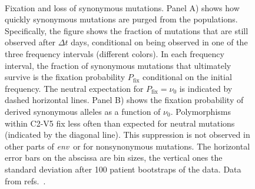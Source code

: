 \documentclass[rmp, twocolumn]{revtex4}
\newcommand{\pfix}{P_{\mathrm{fix}}}
\newcommand{\env}{\textit{env}}
\newcommand{\shankaregion}{C2-V5}
\begin{document}
\begin{figure}
\begin{center}
\\
\caption{Fixation and loss of synonymous mutations.
Panel A) shows how quickly synonymous mutations are purged from the populations. 
Specifically, the figure shows the fraction of mutations that are still observed
after $\Delta t$ days, conditional on being observed in one of the three frequency 
intervals (different colors). 
In each frequency interval, the fraction of synonymous
mutations that ultimately survive is the fixation probability $\pfix$ conditional on the
initial frequency. The neutral expectation for $\pfix=\nu_0$ is indicated by 
dashed horizontal lines.
Panel B) shows the fixation probability of derived synonymous
alleles as a function of $\nu_0$. Polymorphisms within \shankaregion{} fix less
often than expected for neutral mutations (indicated by the diagonal line).
This suppression is not observed in other parts of \env~or for nonsynonymous mutations.
The horizontal error bars on the abscissa are bin sizes, the vertical ones the
standard deviation after 100 patient bootstraps of the data. Data from
refs.~\cite{shankarappa_consistent_1999,liu_selection_2006, bunnik_autologous_2008}.}
\label{fig:fixp}
\end{center}
\end{figure}
\end{document}
